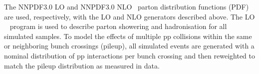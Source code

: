 The \textsc{NNPDF}3.0 LO and \textsc{NNPDF}3.0 NLO~\cite{nnpdf} parton
distribution functions (PDF) are used, respectively, with the LO and
NLO generators described above. The LO ~\cite{pythia}
program is used to describe parton showering and hadronisation for all
simulated samples. To model the effects of multiple pp collisions
within the same or neighboring bunch crossings (pileup), all simulated
events are generated with a nominal distribution of pp interactions
per bunch crossing and then reweighted to match the pileup
distribution as measured in data.

